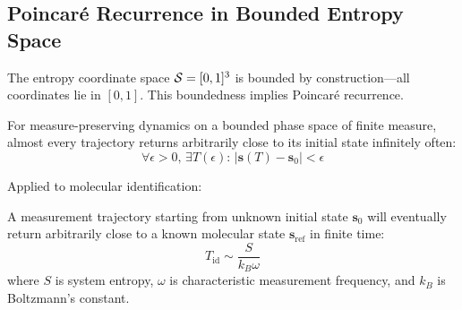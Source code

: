 \subsection{Poincaré Recurrence in Bounded Entropy Space}

The entropy coordinate space $\mathcal{S} = [0,1]^3$ is bounded by construction—all coordinates lie in $[0,1]$. This boundedness implies Poincaré recurrence.

\begin{theorem}
\label{thm:poincare}
For measure-preserving dynamics on a bounded phase space of finite measure, almost every trajectory returns arbitrarily close to its initial state infinitely often:
\begin{equation}
\forall \epsilon > 0, \, \exists T(\epsilon) : \, |\mathbf{s}(T) - \mathbf{s}_0| < \epsilon
\end{equation}
\end{theorem}

Applied to molecular identification:

\begin{corollary}
\label{cor:identification_recurrence}
A measurement trajectory starting from unknown initial state $\mathbf{s}_0$ will eventually return arbitrarily close to a known molecular state $\mathbf{s}_{\text{ref}}$ in finite time:
\begin{equation}
T_{\text{id}} \sim \frac{S}{k_B \omega}
\end{equation}
where $S$ is system entropy, $\omega$ is characteristic measurement frequency, and $k_B$ is Boltzmann's constant.
\end{corollary}


